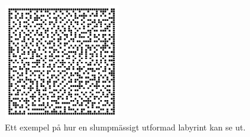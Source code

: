 
\begin{figure}[h]
	\begin{center}
		\includegraphics[width=0.45\textwidth]{../img/w09-lab/RandomMaze.jpg}
	\end{center}
	\caption{Ett exempel på hur en slumpmässigt utformad labyrint kan se ut.}
\end{figure}

